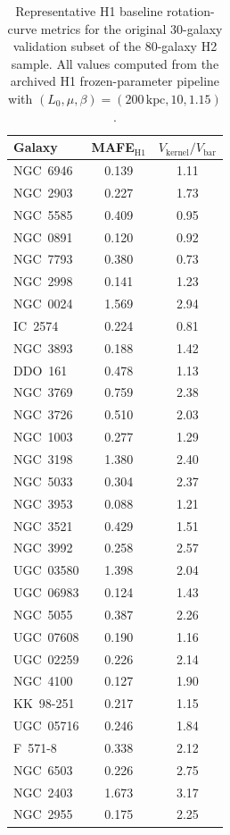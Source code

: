 \documentclass[twocolumn,linenumbers]{aastex701}
\begin{document}
\clearpage
\begin{table}[ht]
	\caption{Representative H1 baseline rotation-curve metrics for the
	original 30-galaxy validation subset of the 80-galaxy H2 sample. All
	values computed from the archived H1 frozen-parameter pipeline with
	$(L_0, \mu, \beta) = (200\,\mathrm{kpc}, 10, 1.15)$.}
	\label{tab:h1_baseline}
	\centering
	\small
	\begin{tabular}{lcc}
		\hline\hline
		Galaxy & MAFE$_{\mathrm{H1}}$ & $V_{\mathrm{kernel}}/V_{\mathrm{bar}}$ \\
		\hline
		NGC~6946  & 0.139 & 1.11 \\
		NGC~2903  & 0.227 & 1.73 \\
		NGC~5585  & 0.409 & 0.95 \\
		NGC~0891  & 0.120 & 0.92 \\
		NGC~7793  & 0.380 & 0.73 \\
		NGC~2998  & 0.141 & 1.23 \\
		NGC~0024  & 1.569 & 2.94 \\
		IC~2574   & 0.224 & 0.81 \\
		NGC~3893  & 0.188 & 1.42 \\
		DDO~161   & 0.478 & 1.13 \\
		NGC~3769  & 0.759 & 2.38 \\
		NGC~3726  & 0.510 & 2.03 \\
		NGC~1003  & 0.277 & 1.29 \\
		NGC~3198  & 1.380 & 2.40 \\
		NGC~5033  & 0.304 & 2.37 \\
		NGC~3953  & 0.088 & 1.21 \\
		NGC~3521  & 0.429 & 1.51 \\
		NGC~3992  & 0.258 & 2.57 \\
		UGC~03580 & 1.398 & 2.04 \\
		UGC~06983 & 0.124 & 1.43 \\
		NGC~5055  & 0.387 & 2.26 \\
		UGC~07608 & 0.190 & 1.16 \\
		UGC~02259 & 0.226 & 2.14 \\
		NGC~4100  & 0.127 & 1.90 \\
		KK~98-251 & 0.217 & 1.15 \\
		UGC~05716 & 0.246 & 1.84 \\
		F~571-8   & 0.338 & 2.12 \\
		NGC~6503  & 0.226 & 2.75 \\
		NGC~2403  & 1.673 & 3.17 \\
		NGC~2955  & 0.175 & 2.25 \\
		\hline
	\end{tabular}
\end{table}
\end{document}
